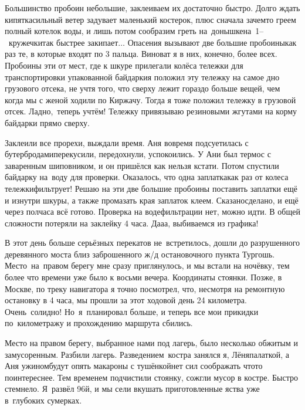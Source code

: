 Большинство пробоин небольшие, заклеиваем их достаточно быстро. Долго ждать кипятка\mdash сильный ветер задувает маленький костерок, плюс сначала зачем\sdash то греем полный котелок воды, и лишь потом сообразим греть на~донышке\mdash на~1\thinspace--~кружечки\mdash так быстрее закипает$\ldots$
\newpage
Опасения вызывают две большие пробоины\mdash как раз те, в которые входят по 3 пальца. Виноват я в них, конечно, более всех. Пробоины эти от мест, где к шкуре прилегали колёса тележки для транспортировки упакованной байдарки\mdash я положил эту тележку на самое дно грузового отсека, не учтя того, что сверху лежит гораздо больше вещей, чем когда мы с женой ходили по Киржачу. Тогда я тоже положил тележку в грузовой отсек. Ладно,~теперь учтём! Тележку привязываю резиновыми жгутами на корму байдарки прямо сверху. 

Заклеили все прорехи, выждали время. Аня вовремя подсуетилась с бутербродами\mdash перекусили, передохнули, успокоились. У Ани был термос с заваренным шиповником, и он пришёлся как нельзя кстати. Потом спустили байдарку на~воду для проверки. Оказалось, что одна заплатка\mdash как раз от колеса тележки\mdash фильтрует! Решаю на эти две большие пробоины поставить заплатки ещё и изнутри шкуры, а также промазать края заплаток клеем. Сказано\mdash сделано, и ещё через полчаса всё готово. Проверка на воде\mdash фильтрации нет, можно идти. В общей сложности потеряли на заклейку 4 часа. Да\sdash а\sdash а, выбиваемся из графика! 

В этот день больше серьёзных перекатов не~встретилось, дошли до разрушенного деревянного моста близ заброшенного ж/д остановочного пункта Тургошь. Место~на~правом берегу мне сразу приглянулось, и мы встали на ночёвку, тем более что времени уже было к восьми вечера. Координаты стоянки\mdash \CoordsLidFifteenTurgosch. Позже, в Москве, по треку навигатора я точно посмотрел, что, несмотря на ремонтную остановку в 4 часа, мы прошли за этот ходовой день 24 километра. Очень~солидно! Но~я~планировал больше, и теперь все мои прикидки по~километражу и прохождению маршрута сбились.
 
Место на правом берегу, выбранное нами под лагерь, было несколько обжитым и замусоренным. Разбили лагерь. Разведением~костра занялся я, Лёня\mdash палаткой, а Аня ужином\mdash будут опять макароны с тушёнкой\mdash нет сил соображать что\sdash то поинтереснее. Тем временем подчистили стоянку, сожгли мусор в костре. Быстро стемнело. Я~развёл 96\sdash й, и мы сели вкушать приготовленные яства уже в~глубоких сумерках.

